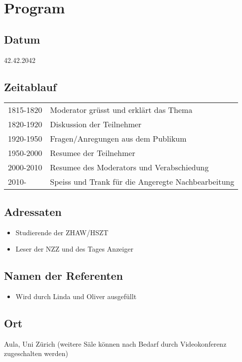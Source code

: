 \documentclass{scrartcl}
\begin{document}
\section{Program}
\subsection{Datum}
42.42.2042

\subsection{Zeitablauf}
\begin{tabular}{ll}
1815-1820 & Moderator grüsst und erklärt das Thema\\
1820-1920 & Diskussion der Teilnehmer\\
1920-1950 & Fragen/Anregungen aus dem Publikum\\
1950-2000 & Resumee der Teilnehmer\\
2000-2010 & Resumee des Moderators und Verabschiedung\\
2010-         & Speiss und Trank für die Angeregte Nachbearbeitung\\
\end{tabular}

\subsection{Adressaten}
\begin{itemize}
 \item Studierende der ZHAW/HSZT
 \item Leser der NZZ und des Tages Anzeiger
\end{itemize}


\subsection{Namen der Referenten}
\begin{itemize}
 \item Wird durch Linda und Oliver ausgefüllt
\end{itemize}

\subsection{Ort}
Aula, Uni Zürich (weitere Säle können nach Bedarf durch Videokonferenz zugeschalten werden)
\end{document}
